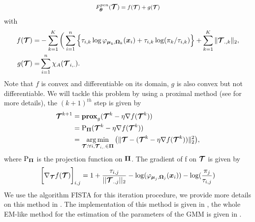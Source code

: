 \begin{equation}
F^{pen}_{{\boldsymbol\theta}}(\boldsymbol{\mathcal T})={\large f}({\footnotesize\boldsymbol{\mathcal T}})+ {\large g}({\footnotesize\boldsymbol{\mathcal T}})
\end{equation}
with
\begin{align*}
f(\boldsymbol{\mathcal T}) =& -\sum_{k=1}^K \bigg(\sum_{i=1}^{n} \Big\{\tau_{i,k}\log\varphi_{\boldsymbol\mu_{k},\boldsymbol\Omega_{k}}(\boldsymbol x_i)+\tau_{i,k} \log(\pi_k/\tau_{i,k})\Big\} + \sum_{k=1}^K \|\boldsymbol{\mathcal T}_{.,k}\|_{2},\\
g(\boldsymbol{\mathcal T}) =& \sum_{i=1}^{n} \chi_A(\boldsymbol{\mathcal T}_{i,.}).
\end{align*}
Note that $f$ is convex and differentiable on its domain, $g$ is also convex but not differentiable. We will tackle this problem by using a proximal method (see \citep{Parikh:2014:PA:2693612.2693613} for more details), the $(k+1)^{th}$ step is given by
\begin{align*}
  \boldsymbol{\mathcal T}^{k+1} &= {\bf{prox}}_{g}(\boldsymbol{\mathcal T}^k - \eta \nabla f(\boldsymbol{\mathcal T}^k))\\
      &= \textnormal{P}_{\boldsymbol\Pi}(\boldsymbol{\mathcal T}^k - \eta \nabla f(\boldsymbol{\mathcal T}^k))\\
      &=\operatorname*{arg\,min}_{ \boldsymbol{\mathcal T} : \forall i, \boldsymbol{\mathcal T}_{i,.} \in \boldsymbol\Pi}\big( \| \boldsymbol{\mathcal T} - (\boldsymbol{\mathcal T}^k - \eta \nabla f(\boldsymbol{\mathcal T}^k) ) \|^2_2 \big),
\end{align*}
where $\textnormal{P}_{\boldsymbol\Pi}$ is the projection function on $\boldsymbol\Pi$. The gradient of f on $\boldsymbol{\mathcal T}$ is given by
\begin{equation}
\bigg[\nabla_{\boldsymbol{\mathcal T}}f(\boldsymbol{\mathcal T})\bigg]_{i,j} = 
1+\frac{\tau_{i,j}}{||\boldsymbol{\mathcal T}_{.,j}||_2}-\log(\varphi_{\boldsymbol\mu_j,\boldsymbol\Omega_j}(\boldsymbol x_i))-\log(\frac{\pi_j}{\tau_{i,j}})
\end{equation}
We use the algorithm FISTA \citep{Beck:2009:FIS:1658360.1658364} for this iteration procedure, we provide more details on this method in . The implementation of this method is given in , the whole EM-like method for the estimation of the parameters of the GMM is given in . 
